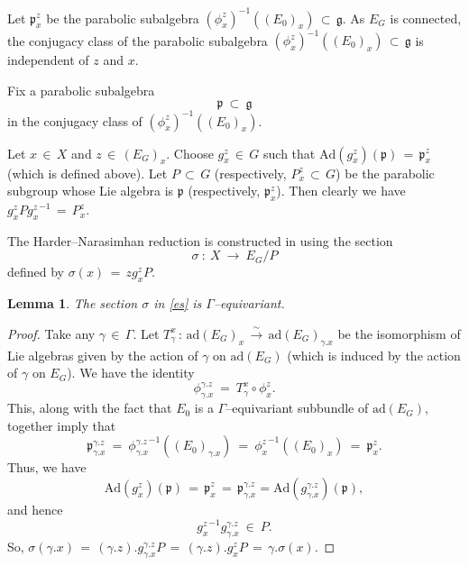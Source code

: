 \documentclass[12pt, reqno]{amsart}
\numberwithin{equation}{section}
\newtheorem{lemma}[theorem]{Lemma}
\newcommand{\Ad}{\textrm{Ad}}
\begin{document}
Let $\mathfrak{p}^{z}_{x}$ be the parabolic subalgebra $(\phi^{z}_{x})^{-1}((E_{0})_{x})
\, \subset\, \mathfrak{g}$. As $E_G$ is connected, the conjugacy class of the parabolic
subalgebra $(\phi^{z}_{x})^{-1}((E_{0})_{x})\, \subset\, \mathfrak{g}$ is independent of $z$ and $x$.

Fix a parabolic subalgebra
$$
\mathfrak{p}\ \subset\ \mathfrak{g}
$$
in the conjugacy class of $(\phi^{z}_{x})^{-1}((E_{0})_{x})$.

Let $x\,\in\, X$ and $z\,\in\, (E_{G})_{x}$. Choose $g^{z}_{x}\,\in\, G$ such that
$\Ad(g^{z}_{x})(\mathfrak{p})\,=\, \mathfrak{p}^{z}_{x}$ (which is defined above). Let
$P\, \subset\, G$ (respectively, $P^{z}_{x}\, \subset\, G$) be the parabolic subgroup whose
Lie algebra is $\mathfrak p$ (respectively, $\mathfrak{p}^{z}_{x}$).
Then clearly we have $g^{z}_{x}P{g^{z}_{x}}^{-1}\,=\,P^{z}_{x}$.

The Harder--Narasimhan reduction is constructed in \cite[Lemma 2.11]{AB2} using the section
\begin{equation}\label{es}
\sigma\ :\ X\ \longrightarrow\ E_{G}/P
\end{equation}
defined by $\sigma(x)\,=\, zg^{z}_{x}P$.
 
\begin{lemma}\label{leme}
The section $\sigma$ in \eqref{es} is $\Gamma$--equivariant.
\end{lemma}

\begin{proof}
Take any $\gamma \,\in\, \Gamma$. Let $T^{x}_{\gamma}\,:\,\text{ad}(E_G)_{x}\,\overset{\sim}\longrightarrow\,
\text{ad}(E_G)_{\gamma. x}$ be the isomorphism of Lie algebras given by the action of $\gamma$
on $\text{ad}(E_G)$ (which is induced by the action of $\gamma$ on $E_G$).
We have the identity \[\phi^{\gamma.z}_{\gamma.x}\ =\ T^{x}_{\gamma}\circ\phi^{z}_{x}.\] This, along with the
fact that $E_{0}$ is a $\Gamma$--equivariant subbundle of $\text{ad}(E_G)$, together imply
that \[\mathfrak{p}^{\gamma.z}_{\gamma.x}\ =\ {\phi^{\gamma.z}_{\gamma.x}}^{-1}((E_{0})_{\gamma.x})
\ =\ {\phi^{z}_{x}}^{-1}((E_{0})_{x})\ =\ \mathfrak{p}^{z}_{x}.\] Thus, we have
$$\Ad(g^{z}_{x})(\mathfrak{p})\,=\,\mathfrak{p}^{z}_{x}\,=\,\mathfrak{p}^{\gamma.z}_{\gamma.x}
=\Ad(g^{\gamma.z}_{\gamma.x})(\mathfrak{p}),$$ and hence $${g^{z}_{x}}^{-1}g^{\gamma.z}_{\gamma.x}\
\in\ P.$$ So, $\sigma(\gamma.x)\,=\,(\gamma.z).g^{\gamma.z}_{\gamma.x}P\,=\,(\gamma.z).g^{z}_{x}P
\,=\,\gamma.\sigma(x)$.
\end{proof}
\end{document}
